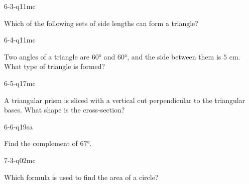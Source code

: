 \begin{practiceQuestion}{6-3-q11}{mc}
\begin{questionText}
Which of the following sets of side lengths can form a triangle?
\end{questionText}
\end{practiceQuestion}

\begin{practiceQuestion}{6-4-q11}{mc}
\begin{questionText}
Two angles of a triangle are $60°$ and $60°$, and the side between them is $5$ cm. What type of triangle is formed?
\end{questionText}
\end{practiceQuestion}

\begin{practiceQuestion}{6-5-q17}{mc}
\begin{questionText}
A triangular prism is sliced with a vertical cut perpendicular to the triangular bases. What shape is the cross-section?
\end{questionText}
\end{practiceQuestion}

\begin{practiceQuestion}{6-6-q19}{sa}
\begin{questionText}
Find the complement of $67°$.
\end{questionText}
\end{practiceQuestion}

\begin{practiceQuestion}{7-3-q02}{mc}
\begin{questionText}
Which formula is used to find the area of a circle?
\end{questionText}
\end{practiceQuestion}

